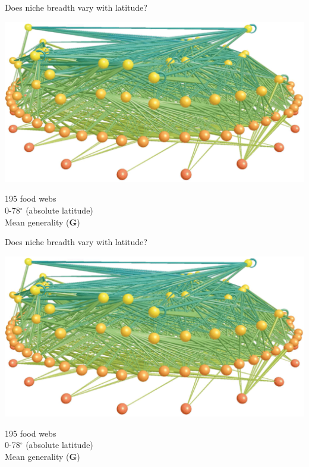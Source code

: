 \documentclass{beamer}
\begin{document}
  \begin{frame}{Does niche breadth vary with latitude?}

    \begin{center}
      \includegraphics*[width=.8\textwidth]{Figures/LittleRockLake.eps}


    195 food webs \\
    0-78$^\circ$ (absolute latitude) \\
    {\color{white} Mean generality (\textbf{G})}

    \end{center}

  \end{frame}


  \begin{frame}{Does niche breadth vary with latitude?}

    \begin{center}
      \includegraphics*[width=.8\textwidth]{Figures/LittleRockLake.eps}


    195 food webs \\
    0-78$^\circ$ (absolute latitude) \\
    Mean generality (\textbf{G})

    \end{center}

  \end{frame}
\end{document}
